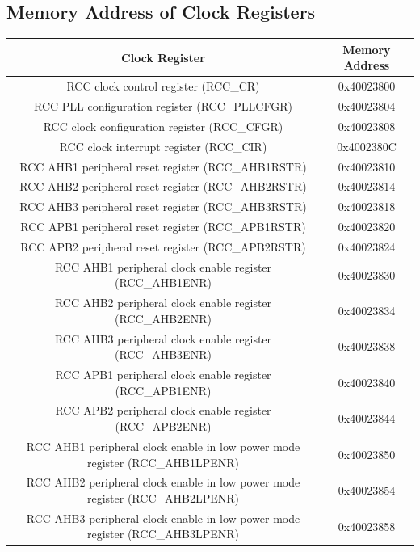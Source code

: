 \documentclass[12pt]{article}
\begin{document}
\subsection{Memory Address of Clock Registers}
\begin{tabular}{ |c|c| }
        \hline
        \textbf{Clock Register} & \textbf{Memory Address} \\
        \hline
        RCC clock control register (RCC\_CR) & 0x40023800 \\
        \hline
        RCC PLL configuration register (RCC\_PLLCFGR) & 0x40023804 \\
        \hline
        RCC clock configuration register (RCC\_CFGR) & 0x40023808 \\
        \hline
        RCC clock interrupt register (RCC\_CIR) & 0x4002380C \\
        \hline
        RCC AHB1 peripheral reset register (RCC\_AHB1RSTR) & 0x40023810 \\
        \hline
        RCC AHB2 peripheral reset register (RCC\_AHB2RSTR) & 0x40023814 \\
        \hline
        RCC AHB3 peripheral reset register (RCC\_AHB3RSTR) & 0x40023818 \\
        \hline
        RCC APB1 peripheral reset register (RCC\_APB1RSTR) & 0x40023820 \\
        \hline
        RCC APB2 peripheral reset register (RCC\_APB2RSTR) & 0x40023824 \\
        \hline
        RCC AHB1 peripheral clock enable register (RCC\_AHB1ENR)  & 0x40023830 \\
        \hline
        RCC AHB2 peripheral clock enable register (RCC\_AHB2ENR) & 0x40023834 \\
        \hline
        RCC AHB3 peripheral clock enable register (RCC\_AHB3ENR) & 0x40023838 \\
        \hline
        RCC APB1 peripheral clock enable register (RCC\_APB1ENR) & 0x40023840 \\
        \hline
        RCC APB2 peripheral clock enable register (RCC\_APB2ENR) & 0x40023844 \\
        \hline
        RCC AHB1 peripheral clock enable in low power mode register (RCC\_AHB1LPENR) & 0x40023850 \\
        \hline
        RCC AHB2 peripheral clock enable in low power mode register (RCC\_AHB2LPENR) & 0x40023854 \\
        \hline
        RCC AHB3 peripheral clock enable in low power mode register (RCC\_AHB3LPENR) & 0x40023858 \\

\end{tabular}
\end{document}
